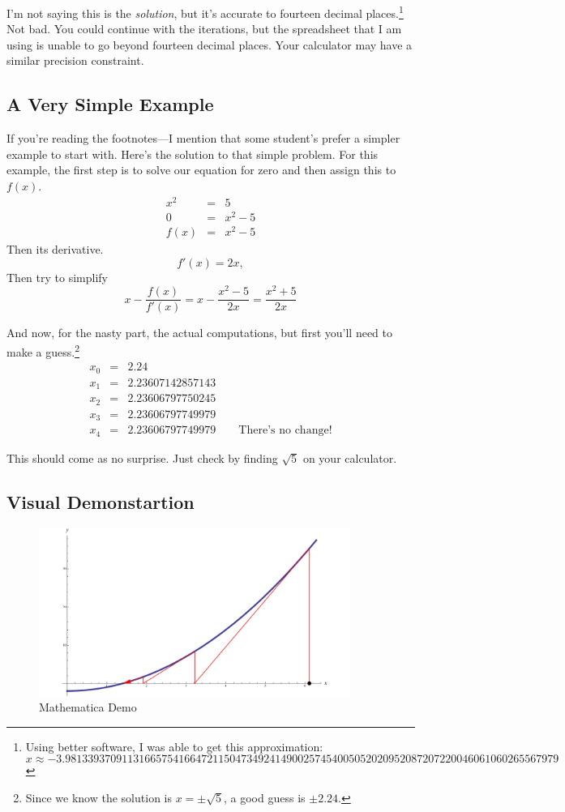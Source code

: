 \documentclass[12pt,addpoints, answers, fleqn]{exam}
\begin{document}
I'm not saying this is the \emph{solution}, but it's accurate to fourteen decimal places.\footnote{Using better software, I was able to get this approximation:
\[
x \approx -3.981339370911316657541664721150473492414900257454005052020952087207220046061060265567979
\]} Not bad. You could continue with the iterations, but the spreadsheet that I am using is unable to go beyond fourteen decimal places. Your calculator may have a similar precision constraint.

\subsection{A Very Simple Example}
If you're reading the footnotes---I mention that some student's prefer a simpler example to start with. Here's the solution to that simple problem. For this example, the first step is to solve our equation for zero and then assign this to $f\left(x\right)$.
\begin{eqnarray*}
x^2&=&5\\
0&=&x^2-5\\
f\left(x\right) &=& x^2-5
\end{eqnarray*}
Then its derivative.
\[
f'\left(x\right) = 2x,
\]
Then try to simplify
\[
x - \frac{f\left( x \right)}{f'\left( x \right)} = x - \frac{x^2-5}{2x}= \frac{x^2+5}{2x}
\]

And now, for the nasty part, the actual computations, but first you'll need to make a guess.\footnote{Since we know the solution is $x=\pm \sqrt{5}$, a good guess is $\pm 2.24$.}
\begin{eqnarray*}
x_0 &=& 2.24\\
x_1 &=& 2.23607142857143\\
x_2 &=& 2.23606797750245\\
x_3 &=& 2.23606797749979\\
x_4 &=& 2.23606797749979 \qquad \text{There's no change!}
\end{eqnarray*}



This should come as no surprise. Just check by finding $\sqrt{5}$ on your calculator.

\subsection{Visual Demonstartion}
\begin{figure}[htbp] %
   \centering
   \includegraphics[width=4in]{./graphics/LearningNewtonsMethod.pdf} 
   \caption{Mathematica Demo}
   \label{fig:LearningNewtonsMethod}
\end{figure}
\end{document}
